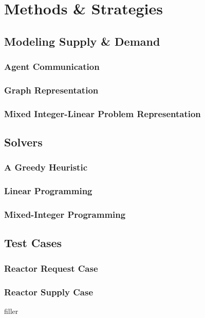 \section{Methods \& Strategies}

\subsection{Modeling Supply \& Demand}

\subsubsection{Agent Communication}


\subsubsection{Graph Representation}


\subsubsection{Mixed Integer-Linear Problem Representation}


\subsection{Solvers}

\subsubsection{A Greedy Heuristic}

\subsubsection{Linear Programming}


\subsubsection{Mixed-Integer Programming}


\subsection{Test Cases}

\subsubsection{Reactor Request Case}

\subsubsection{Reactor Supply Case}

filler
